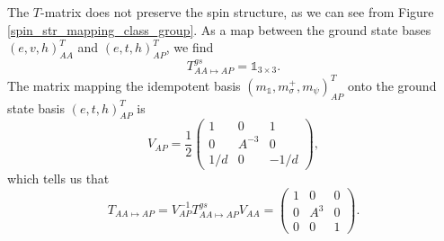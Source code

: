 \documentclass[12pt,a4paper]{article}
\newcommand{\unit}{\mathds{1}}
\newcommand\be            {\begin{equation}}
\newcommand\ee            {\end{equation}}
\begin{document}
The $T$-matrix does not preserve the spin structure, as we can see from Figure \ref{spin_str_mapping_class_group}. As a map between the ground state bases $(e,v,h)^T_{AA}$ and $(e,t,h)_{AP}^T$, we find
\be T_{AA\mapsto AP}^{gs} = \unit_{3\times 3}.\ee
The matrix mapping the idempotent basis $(m_\unit,m_\sigma^+,m_\psi)^T_{AP}$ onto the ground state basis $(e,t,h)_{AP}^T$  is
\be V_{AP} = \frac{1}{2} \begin{pmatrix} 1 & 0 & 1 \\ 0 & A^{-3} & 0 \\ 1/d & 0 & -1/d \end{pmatrix},\ee
which tells us that 
\be T_{AA\mapsto AP} = V_{AP}^{-1} T_{AA\mapsto AP}^{gs} V_{AA} =  \begin{pmatrix}
1 &0&0 \\ 0&A^3&0\\0&0&1
\end{pmatrix}.\ee
\end{document}
